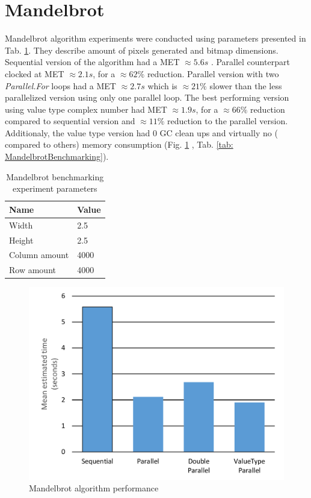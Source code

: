 \section{Mandelbrot}
Mandelbrot algorithm experiments were conducted using parameters presented in 
Tab. \ref{tab: MandelbrotParameters}. They describe amount of pixels 
generated and bitmap dimensions.
Sequential version of the algorithm had a MET  $\approx 5.6s$ . Parallel 
counterpart clocked at MET  $\approx 2.1s$, for a $\approx 62\%$ reduction. 
Parallel version with two \emph{Parallel.For} loops had a MET $\approx 2.7s$ 
which is $\approx 21\%$ slower than the less parallelized version using only 
one parallel loop. The best performing version using value type complex 
number had MET $\approx 1.9s$, for a $\approx 66\%$  reduction compared to 
sequential version and $\approx 11\%$  reduction to the parallel version. 
Additionaly, the value type version had 0 GC clean ups and virtually no (
compared to others) memory consumption (Fig. \ref{fig: MandelbrotPerformance}
, Tab. \ref{tab: MandelbrotBenchmarking}).

\begin{table}[!ht]
    \centering
    \caption{Mandelbrot benchmarking experiment parameters}
		\label{tab: MandelbrotParameters}
    \begin{tabular}{p{3cm}p{3cm}}
			\toprule
			\bfseries Name 	&
			\bfseries Value \\
			\midrule
			Width & 2.5 \\
			Height & 2.5 \\
			Column amount & 4000 \\ 
			Row amount  & 4000 \\	
			\bottomrule
    \end{tabular}
\end{table}

\begin{figure}[htb]
\centering
\includegraphics[width=.8\linewidth]{figures04/Mandelbrot.pdf}
\caption{Mandelbrot algorithm performance}
\label{fig: MandelbrotPerformance}
\end{figure}

